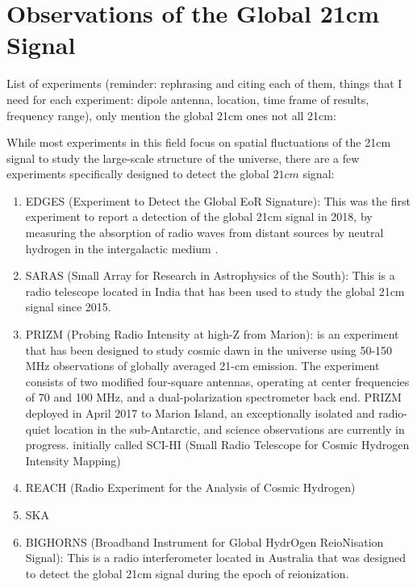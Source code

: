 \documentclass[12pt, TexShade, letterpaper]{report}
\begin{document}
\chapter{Observations of the Global 21cm Signal}
\label{chap:observations}
List of experiments (reminder: rephrasing and citing each of them,  things that I need for each experiment: dipole antenna, location, time frame of results, frequency range), only mention the global 21cm ones not all 21cm:\par
 While most experiments in this field focus on spatial fluctuations of the 21cm signal to study the large-scale structure of the universe, there are a few experiments specifically designed to detect the global $21cm$ signal:
\begin{enumerate}
\item EDGES (Experiment to Detect the Global EoR Signature): This was the first experiment to report a detection of the global 21cm signal in 2018, by measuring the absorption of radio waves from distant sources by neutral hydrogen in the intergalactic medium \cite{edges}.

\item SARAS (Small Array for Research in Astrophysics of the South): This is a radio telescope located in India that has been used to study the global 21cm signal since 2015.

\item PRIZM (Probing Radio Intensity at high-Z from Marion): is an experiment that has been designed to study cosmic dawn in the universe using 50-150 MHz observations of globally averaged 21-cm emission. The experiment consists of two modified four-square antennas, operating at center frequencies of 70 and 100 MHz, and a dual-polarization spectrometer back end. PRIZM deployed in April 2017 to Marion Island, an exceptionally isolated and radio-quiet location in the sub-Antarctic, and science observations are currently in progress.
initially called SCI-HI (Small Radio Telescope for Cosmic Hydrogen Intensity Mapping)
\item REACH (Radio Experiment for the Analysis of Cosmic Hydrogen)

\item SKA \cite{SKA_global_21}

\item BIGHORNS (Broadband Instrument for Global HydrOgen ReioNisation Signal): This is a radio interferometer located in Australia that was designed to detect the global 21cm signal during the epoch of reionization.

\end{enumerate}
\end{document}
